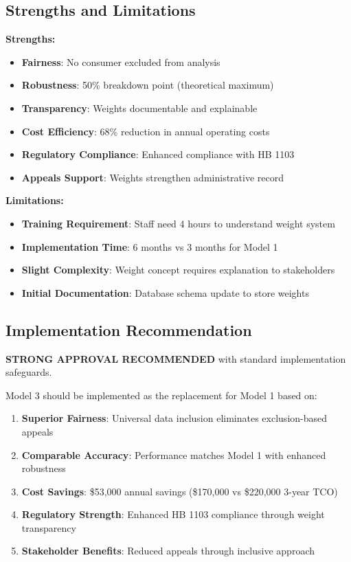 \subsection{Strengths and Limitations}

\textbf{Strengths:}
\begin{itemize}
    \item \textbf{Fairness}: No consumer excluded from analysis
    \item \textbf{Robustness}: 50\% breakdown point (theoretical maximum)
    \item \textbf{Transparency}: Weights documentable and explainable
    \item \textbf{Cost Efficiency}: 68\% reduction in annual operating costs
    \item \textbf{Regulatory Compliance}: Enhanced compliance with HB 1103
    \item \textbf{Appeals Support}: Weights strengthen administrative record
\end{itemize}

\textbf{Limitations:}
\begin{itemize}
    \item \textbf{Training Requirement}: Staff need 4 hours to understand weight system
    \item \textbf{Implementation Time}: 6 months vs 3 months for Model 1
    \item \textbf{Slight Complexity}: Weight concept requires explanation to stakeholders
    \item \textbf{Initial Documentation}: Database schema update to store weights
\end{itemize}

\subsection{Implementation Recommendation}

\textbf{STRONG APPROVAL RECOMMENDED} with standard implementation safeguards.

Model 3 should be implemented as the replacement for Model 1 based on:
\begin{enumerate}
    \item \textbf{Superior Fairness}: Universal data inclusion eliminates exclusion-based appeals
    \item \textbf{Comparable Accuracy}: Performance matches Model 1 with enhanced robustness
    \item \textbf{Cost Savings}: \$53,000 annual savings (\$170,000 vs \$220,000 3-year TCO)
    \item \textbf{Regulatory Strength}: Enhanced HB 1103 compliance through weight transparency
    \item \textbf{Stakeholder Benefits}: Reduced appeals through inclusive approach
\end{enumerate}

